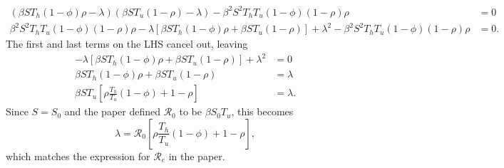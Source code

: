 \documentclass[10pt]{article}
\newcommand{\rr}{\mathscr{R}_0}
\begin{document}
\begin{enumerate}
\begin{align*}
			\left( \beta S T_h (1-\phi) \rho -\lambda \right) \left( \beta S T_u (1-\rho) - \lambda \right) - \beta^2 S^2 T_h T_u (1-\phi) (1-\rho) \rho &= 0 \\
			\beta^2 S^2 T_h T_u (1-\phi) (1-\rho) \rho - \lambda \left[ \beta S T_h (1-\phi) \rho + \beta S T_u (1-\rho) \right] + \lambda^2 - \beta^2 S^2 T_h T_u (1-\phi) (1-\rho) \rho &= 0.
		\end{align*}
		The first and last terms on the LHS cancel out, leaving
		\begin{align*}
			- \lambda \left[ \beta S T_h (1-\phi) \rho + \beta S T_u (1-\rho) \right] + \lambda^2 &= 0 \\
			\beta S T_h (1-\phi) \rho + \beta S T_u (1-\rho) &= \lambda \\
			\beta S T_u \left[ \rho \frac{T_h}{T_u} (1-\phi) + 1 - \rho \right] &= \lambda.
		\end{align*}
		Since $S = S_0$ and the paper defined $\mathscr{R}_0$ to be $\beta S_0 T_u$, this becomes
		\[
			\lambda = \rr \left[ \rho \frac{T_h}{T_u} (1-\phi) + 1 - \rho \right],
		\] which matches the expression for $\mathscr{R}_e$ in the paper.

\end{enumerate}
\end{document}
